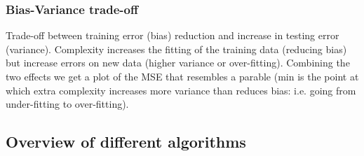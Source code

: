 \documentclass[11pt]{article}
\begin{document}
\subsubsection{Bias-Variance trade-off}
Trade-off between training error (bias) reduction and increase in testing error (variance).
Complexity increases the fitting of the training data (reducing bias) but increase errors on new data (higher variance or over-fitting). Combining the two effects we get a plot of the MSE that resembles a parable (min is the point at which extra complexity increases more variance than reduces bias: i.e. going from under-fitting to over-fitting).

\subsection{Overview of different algorithms}
\end{document}
